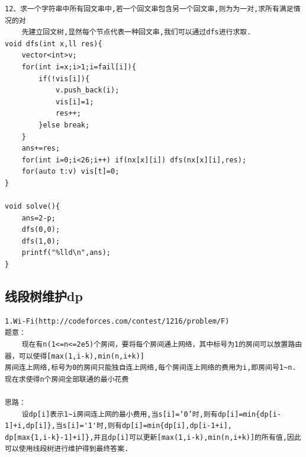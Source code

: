 \documentclass[twoside]{article}
\begin{document}
\begin{lstlisting}
12、求一个字符串中所有回文串中,若一个回文串包含另一个回文串,则为为一对,求所有满足情况的对
    先建立回文树,显然每个节点代表一种回文串,我们可以通过dfs进行求取.
void dfs(int x,ll res){
    vector<int>v;
    for(int i=x;i>1;i=fail[i]){
        if(!vis[i]){
            v.push_back(i);
            vis[i]=1;
            res++;
        }else break;
    }
    ans+=res;
    for(int i=0;i<26;i++) if(nx[x][i]) dfs(nx[x][i],res);
    for(auto t:v) vis[t]=0;
}

void solve(){
    ans=2-p;
    dfs(0,0);
    dfs(1,0);
    printf("%lld\n",ans);
}\end{lstlisting}
\subsection{线段树维护dp}
\begin{lstlisting}
1.Wi-Fi(http://codeforces.com/contest/1216/problem/F)
题意：
	现在有n(1<=n<=2e5)个房间，要将每个房间通上网络，其中标号为1的房间可以放置路由器，可以使得[max(1,i-k),min(n,i+k)]
房间连上网络,标号为0的房间只能独自连上网络,每个房间连上网络的费用为i,即房间号1~n.现在求使得n个房间全部联通的最小花费

思路：
	设dp[i]表示1~i房间连上网的最小费用,当s[i]=‘0’时,则有dp[i]=min{dp[i-1]+i,dp[i]},当s[i]='1'时,则有dp[i]=min{dp[i],dp[i-1+i],
dp[max{1,i-k}-1]+i]},并且dp[i]可以更新[max(1,i-k),min(n,i+k)]的所有值,因此可以使用线段树进行维护得到最终答案.\end{lstlisting}
\end{document}
